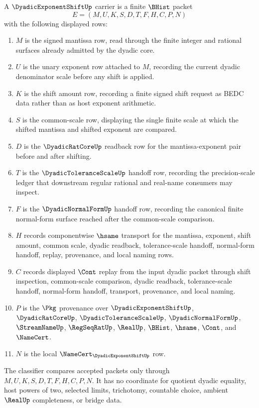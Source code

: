 \begin{definition}
\label{def:dyadic-exponent-shift-carrier}
A $\DyadicExponentShiftUp$ carrier is a finite $\BHist$ packet
$$
E=(M,U,K,S,D,T,F,H,C,P,N)
$$
with the following displayed rows:
\begin{enumerate}
\item $M$ is the signed mantissa row, read through the finite integer and rational surfaces already admitted by the dyadic core.
\item $U$ is the unary exponent row attached to $M$, recording the current dyadic denominator scale before any shift is applied.
\item $K$ is the shift amount row, recording a finite signed shift request as BEDC data rather than as host exponent arithmetic.
\item $S$ is the common-scale row, displaying the single finite scale at which the shifted mantissa and shifted exponent are compared.
\item $D$ is the $\DyadicRatCoreUp$ readback row for the mantissa-exponent pair before and after shifting.
\item $T$ is the $\DyadicToleranceScaleUp$ handoff row, recording the precision-scale ledger that downstream regular rational and real-name consumers may inspect.
\item $F$ is the $\DyadicNormalFormUp$ handoff row, recording the canonical finite normal-form surface reached after the common-scale comparison.
\item $H$ records componentwise $\hsame$ transport for the mantissa, exponent, shift amount, common scale, dyadic readback, tolerance-scale handoff, normal-form handoff, replay, provenance, and local naming rows.
\item $C$ records displayed $\Cont$ replay from the input dyadic packet through shift inspection, common-scale comparison, dyadic readback, tolerance-scale handoff, normal-form handoff, transport, provenance, and local naming.
\item $P$ is the $\Pkg$ provenance over $\DyadicExponentShiftUp$, $\DyadicRatCoreUp$, $\DyadicToleranceScaleUp$, $\DyadicNormalFormUp$, $\StreamNameUp$, $\RegSeqRatUp$, $\RealUp$, $\BHist$, $\hsame$, $\Cont$, and $\NameCert$.
\item $N$ is the local $\NameCert_{\DyadicExponentShiftUp}$ row.
\end{enumerate}
The classifier compares accepted packets only through $M,U,K,S,D,T,F,H,C,P,N$. It has no coordinate for quotient dyadic equality, host powers of two, selected limits, trichotomy, countable choice, ambient $\RealUp$ completeness, or bridge data.
\end{definition}

